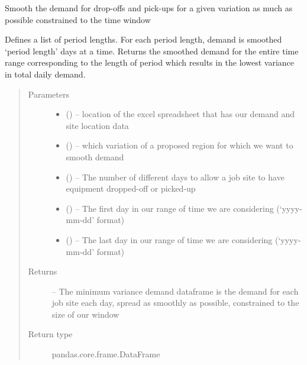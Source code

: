 \documentclass[letterpaper,10pt,english]{sphinxmanual}
\begin{document}
\begin{fulllineitems}
\label{\detokenize{variation:smoothing.smooth_demand}}
Smooth the demand for drop-offs and pick-ups for a given variation as
much as possible constrained to the time window

Defines a list of period lengths. For each period length, demand is smoothed
`period length' days at a time. Returns the smoothed demand for the entire
time range corresponding to the length of period which results in the lowest
variance in total daily demand.
\begin{quote}\begin{description}
\item[{Parameters}] \leavevmode\begin{itemize}
\item {} 
 () -- location of the excel spreadsheet that has our demand and site location
data

\item {} 
 () -- which variation of a proposed region for which we want to smooth demand

\item {} 
 () -- The number of different days to allow a job site to have equipment
dropped-off or picked-up

\item {} 
 () -- The first day in our range of time we are considering (`yyyy-mm-dd'
format)

\item {} 
 () -- The last day in our range of time we are considering (`yyyy-mm-dd'
format)

\end{itemize}

\item[{Returns}] \leavevmode
{} -- The minimum variance demand dataframe is the demand for each job site
each day, spread as smoothly as possible, constrained to the size of
our window

\item[{Return type}] \leavevmode
pandas.core.frame.DataFrame

\end{description}\end{quote}

\end{fulllineitems}
\end{document}
